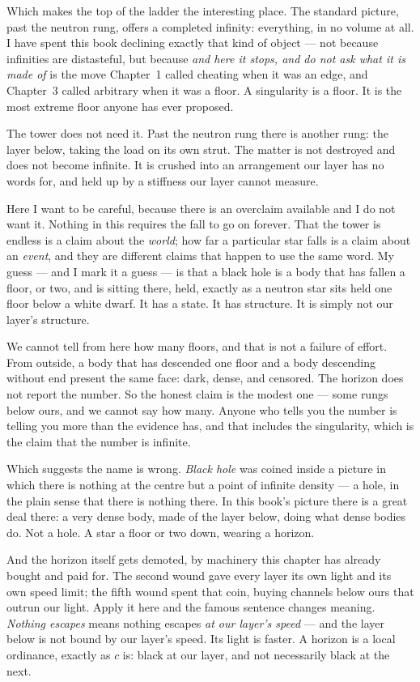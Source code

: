 Which makes the top of the ladder the interesting place. The standard picture, past the neutron rung, offers a completed infinity: everything, in no volume at all. I have spent this book declining exactly that kind of object --- not because infinities are distasteful, but because \emph{and here it stops, and do not ask what it is made of} is the move Chapter~1 called cheating when it was an edge, and Chapter~3 called arbitrary when it was a floor. A singularity is a floor. It is the most extreme floor anyone has ever proposed.

The tower does not need it. Past the neutron rung there is another rung: the layer below, taking the load on its own strut. The matter is not destroyed and does not become infinite. It is crushed into an arrangement our layer has no words for, and held up by a stiffness our layer cannot measure.

Here I want to be careful, because there is an overclaim available and I do not want it. Nothing in this requires the fall to go on forever. That the tower is endless is a claim about the \emph{world}; how far a particular star falls is a claim about an \emph{event}, and they are different claims that happen to use the same word. My guess --- and I mark it a guess --- is that a black hole is a body that has fallen a floor, or two, and is sitting there, held, exactly as a neutron star sits held one floor below a white dwarf. It has a state. It has structure. It is simply not our layer's structure.

We cannot tell from here how many floors, and that is not a failure of effort. From outside, a body that has descended one floor and a body descending without end present the same face: dark, dense, and censored. The horizon does not report the number. So the honest claim is the modest one --- some rungs below ours, and we cannot say how many. Anyone who tells you the number is telling you more than the evidence has, and that includes the singularity, which is the claim that the number is infinite.

Which suggests the name is wrong. \emph{Black hole} was coined inside a picture in which there is nothing at the centre but a point of infinite density --- a hole, in the plain sense that there is nothing there. In this book's picture there is a great deal there: a very dense body, made of the layer below, doing what dense bodies do. Not a hole. A star a floor or two down, wearing a horizon.

And the horizon itself gets demoted, by machinery this chapter has already bought and paid for. The second wound gave every layer its own light and its own speed limit; the fifth wound spent that coin, buying channels below ours that outrun our light. Apply it here and the famous sentence changes meaning. \emph{Nothing escapes} means nothing escapes \emph{at our layer's speed} --- and the layer below is not bound by our layer's speed. Its light is faster. A horizon is a local ordinance, exactly as $c$ is: black at our layer, and not necessarily black at the next.

